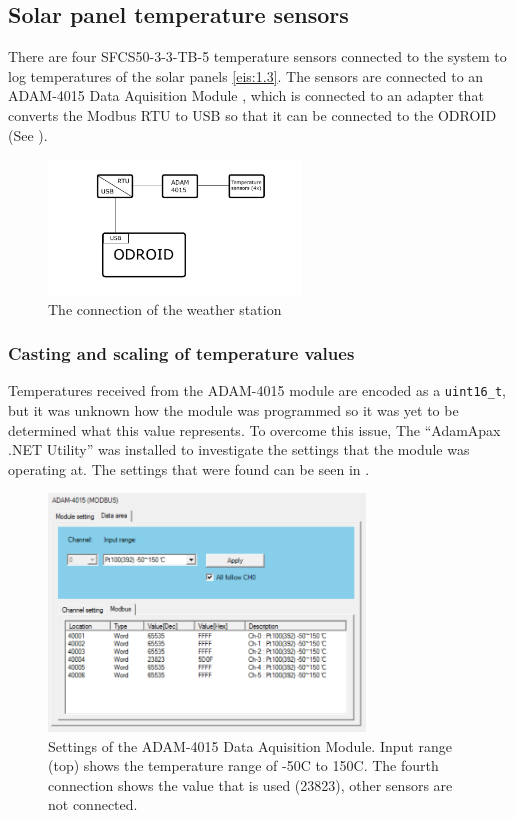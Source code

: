 \subsection{Solar panel temperature sensors}\label{sec:temp_sensors}
There are four SFCS50-3-3-TB-5 temperature sensors \cite{temp_probe_datasheet} connected to the system to log temperatures of the solar panels \ref{eis:1.3}. The sensors are connected to an ADAM-4015 Data Aquisition Module \cite{adam_datasheet}, which is connected to an adapter that converts the Modbus RTU to USB so that it can be connected to the ODROID (See ).

\begin{figure}[!ht]
  \centering
    \includegraphics[width=0.6\textwidth]{images/ODROID_temperature_sensors.pdf}
      \caption{The connection of the weather station}\label{fig:temperature_sensors_connection}
\end{figure}

\subsubsection{Casting and scaling of temperature values}
Temperatures received from the ADAM-4015 module are encoded as a \verb|uint16_t|, but it was unknown how the module was programmed so it was yet to be determined what this value represents. To overcome this issue, The ``AdamApax .NET Utility'' \cite{AdamApax} was installed to investigate the settings that the module was operating at. The settings that were found can be seen in .\\

\begin{figure}[!ht]
  \centering
    \includegraphics[width=0.75\textwidth]{images/ADAM_-50-150.png}
      \caption{Settings of the ADAM-4015 Data Aquisition Module. Input range (top) shows the temperature range of -50\degree C to 150\degree C. The fourth connection shows the value that is used (23823), other sensors are not connected.}\label{fig:ADAM_-50-150}
\end{figure}

